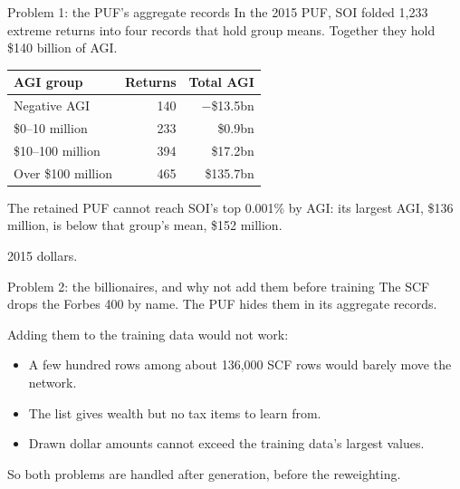 \begin{frame}{Problem 1: the PUF's aggregate records}
  \small
  In the 2015 PUF, SOI folded 1,233 extreme returns into four records that hold group means.
  Together they hold \$140 billion of AGI.
  \vspace{0.5em}
  \begin{center}
    \begin{tabular}{lrr}
      \toprule
      AGI group & Returns & Total AGI \\
      \midrule
      Negative AGI        & 140 & $-$\$13.5bn \\
      \$0--10 million     & 233 & \$0.9bn \\
      \$10--100 million   & 394 & \$17.2bn \\
      Over \$100 million  & 465 & \$135.7bn \\
      \bottomrule
    \end{tabular}
  \end{center}
  \vspace{0.3em}
  The retained PUF cannot reach SOI's top 0.001\% by AGI: its largest AGI, \$136 million, is below
  that group's mean, \$152 million.
  \par\vfill{\scriptsize\color{yalegrey}2015 dollars.}
\end{frame}

\begin{frame}{Problem 2: the billionaires, and why not add them before training}
  \small
  The SCF drops the Forbes 400 by name. The PUF hides them in its aggregate records.
  \vspace{0.5em}

  Adding them to the training data would not work:
  \begin{itemize}
    \item A few hundred rows among about 136,000 SCF rows would barely move the network.
    \item The list gives wealth but no tax items to learn from.
    \item Drawn dollar amounts cannot exceed the training data's largest values.
  \end{itemize}
  \vspace{0.5em}
  So both problems are handled after generation, before the reweighting.
\end{frame}

